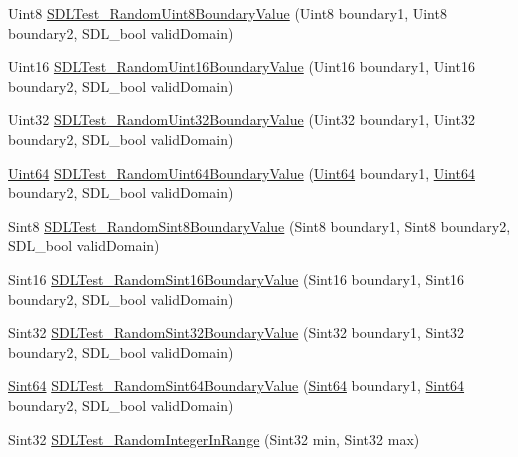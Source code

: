 \begin{DoxyCompactItemize}
\item 
Uint8 \hyperlink{i686-w64-mingw32_2include_2SDL2_2SDL__test__fuzzer_8h_a129a58a37dc23847b8257569bf56d16f}{S\+D\+L\+Test\+\_\+\+Random\+Uint8\+Boundary\+Value} (Uint8 boundary1, Uint8 boundary2, S\+D\+L\+\_\+bool valid\+Domain)
\item 
Uint16 \hyperlink{i686-w64-mingw32_2include_2SDL2_2SDL__test__fuzzer_8h_a3710dba14db764872949252f558429ba}{S\+D\+L\+Test\+\_\+\+Random\+Uint16\+Boundary\+Value} (Uint16 boundary1, Uint16 boundary2, S\+D\+L\+\_\+bool valid\+Domain)
\item 
Uint32 \hyperlink{i686-w64-mingw32_2include_2SDL2_2SDL__test__fuzzer_8h_a9e718145eaf96f611cd67fc530473e3a}{S\+D\+L\+Test\+\_\+\+Random\+Uint32\+Boundary\+Value} (Uint32 boundary1, Uint32 boundary2, S\+D\+L\+\_\+bool valid\+Domain)
\item 
\hyperlink{structUint64}{Uint64} \hyperlink{i686-w64-mingw32_2include_2SDL2_2SDL__test__fuzzer_8h_abc660d9b04554c8c2717325224b88b6a}{S\+D\+L\+Test\+\_\+\+Random\+Uint64\+Boundary\+Value} (\hyperlink{structUint64}{Uint64} boundary1, \hyperlink{structUint64}{Uint64} boundary2, S\+D\+L\+\_\+bool valid\+Domain)
\item 
Sint8 \hyperlink{i686-w64-mingw32_2include_2SDL2_2SDL__test__fuzzer_8h_a09ec06adf1ca58afa5283be6b4f5fdfc}{S\+D\+L\+Test\+\_\+\+Random\+Sint8\+Boundary\+Value} (Sint8 boundary1, Sint8 boundary2, S\+D\+L\+\_\+bool valid\+Domain)
\item 
Sint16 \hyperlink{i686-w64-mingw32_2include_2SDL2_2SDL__test__fuzzer_8h_ae11fb12560b1a9180b1645d6ca1c6af6}{S\+D\+L\+Test\+\_\+\+Random\+Sint16\+Boundary\+Value} (Sint16 boundary1, Sint16 boundary2, S\+D\+L\+\_\+bool valid\+Domain)
\item 
Sint32 \hyperlink{i686-w64-mingw32_2include_2SDL2_2SDL__test__fuzzer_8h_ab17fbfddfa253bb3d64412000488fc07}{S\+D\+L\+Test\+\_\+\+Random\+Sint32\+Boundary\+Value} (Sint32 boundary1, Sint32 boundary2, S\+D\+L\+\_\+bool valid\+Domain)
\item 
\hyperlink{structUint64}{Sint64} \hyperlink{i686-w64-mingw32_2include_2SDL2_2SDL__test__fuzzer_8h_a0b6a8004aba7d72595f80540fa0b6727}{S\+D\+L\+Test\+\_\+\+Random\+Sint64\+Boundary\+Value} (\hyperlink{structUint64}{Sint64} boundary1, \hyperlink{structUint64}{Sint64} boundary2, S\+D\+L\+\_\+bool valid\+Domain)
\item 
Sint32 \hyperlink{i686-w64-mingw32_2include_2SDL2_2SDL__test__fuzzer_8h_a5c81f42e213ad1608cf5f29669eb8521}{S\+D\+L\+Test\+\_\+\+Random\+Integer\+In\+Range} (Sint32 min, Sint32 max)

\end{DoxyCompactItemize}
